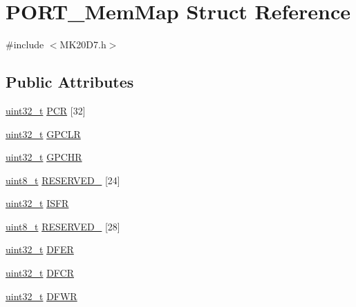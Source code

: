 \hypertarget{struct_p_o_r_t___mem_map}{}\section{P\+O\+R\+T\+\_\+\+Mem\+Map Struct Reference}
\label{struct_p_o_r_t___mem_map}


{\ttfamily \#include $<$M\+K20\+D7.\+h$>$}

\subsection*{Public Attributes}
\begin{DoxyCompactItemize}
\item 
\hyperlink{_p_e___types_8h_a33594304e786b158f3fb30289278f5af}{uint32\+\_\+t} \hyperlink{struct_p_o_r_t___mem_map_afd008b8cccd5729cb9a158478f4cc5fe}{P\+CR} \mbox{[}32\mbox{]}
\item 
\hyperlink{_p_e___types_8h_a33594304e786b158f3fb30289278f5af}{uint32\+\_\+t} \hyperlink{struct_p_o_r_t___mem_map_a837c289643f8cec958b1f01c086b558a}{G\+P\+C\+LR}
\item 
\hyperlink{_p_e___types_8h_a33594304e786b158f3fb30289278f5af}{uint32\+\_\+t} \hyperlink{struct_p_o_r_t___mem_map_a84f8893cbefd6a3eff18b455f9069b29}{G\+P\+C\+HR}
\item 
\hyperlink{_p_e___types_8h_aba7bc1797add20fe3efdf37ced1182c5}{uint8\+\_\+t} \hyperlink{struct_p_o_r_t___mem_map_ae4a902beefca3b681f18c1019be150f7}{R\+E\+S\+E\+R\+V\+E\+D\+\_} \mbox{[}24\mbox{]}
\item 
\hyperlink{_p_e___types_8h_a33594304e786b158f3fb30289278f5af}{uint32\+\_\+t} \hyperlink{struct_p_o_r_t___mem_map_a53c86a08f430dc915a312efe74ba83e6}{I\+S\+FR}
\item 
\hyperlink{_p_e___types_8h_aba7bc1797add20fe3efdf37ced1182c5}{uint8\+\_\+t} \hyperlink{struct_p_o_r_t___mem_map_a2da777455e135deb20e50c39ad50b723}{R\+E\+S\+E\+R\+V\+E\+D\+\_} \mbox{[}28\mbox{]}
\item 
\hyperlink{_p_e___types_8h_a33594304e786b158f3fb30289278f5af}{uint32\+\_\+t} \hyperlink{struct_p_o_r_t___mem_map_ad472de7afdaeef3985761041fe9023e2}{D\+F\+ER}
\item 
\hyperlink{_p_e___types_8h_a33594304e786b158f3fb30289278f5af}{uint32\+\_\+t} \hyperlink{struct_p_o_r_t___mem_map_a0d2552c73fb3c6ed5f336d7df1249151}{D\+F\+CR}
\item 
\hyperlink{_p_e___types_8h_a33594304e786b158f3fb30289278f5af}{uint32\+\_\+t} \hyperlink{struct_p_o_r_t___mem_map_a739d09875cabb44276b89977d36a19ed}{D\+F\+WR}
\end{DoxyCompactItemize}


